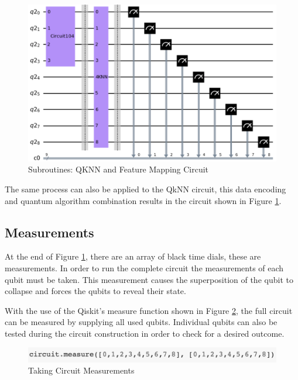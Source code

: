 \begin{figure}[H]
      \centering
      \includegraphics[scale=0.5]{background/FullSubR.png}
      \caption{Subroutines: QKNN and Feature Mapping Circuit }
      \label{FullSR}
\end{figure}

The same process can also be applied to the QkNN circuit, this data encoding and quantum algorithm combination results in the circuit shown in Figure \ref{FullSR}.





\subsection{Measurements}

At the end of Figure \ref{FullSR}, there are an array of black time dials, these are measurements. In order to run the complete circuit the measurements of each qubit must be taken. This measurement causes the superposition of the qubit to collapse and forces the qubits to reveal their state.

With the use of the Qiskit's measure function shown in Figure \ref{Mes}, the full circuit can be measured by supplying all used qubits. Individual qubits can also be tested during the circuit construction in order to check for a desired outcome.
 

\begin{figure}[H]
      \centering
      \includegraphics[scale=0.8]{background/Measure.png}
      \caption{Taking Circuit Measurements  }
      \label{Mes}
\end{figure}



